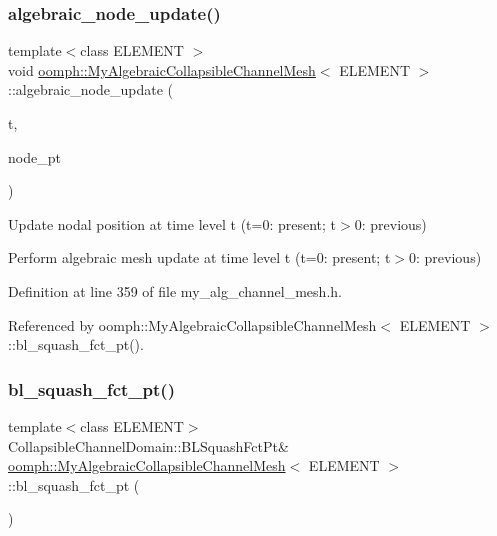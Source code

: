 \subsubsection{\texorpdfstring{algebraic\+\_\+node\+\_\+update()}{algebraic\_node\_update()}}
{\footnotesize\ttfamily template$<$class E\+L\+E\+M\+E\+NT $>$ \\
void \hyperlink{classoomph_1_1MyAlgebraicCollapsibleChannelMesh}{oomph\+::\+My\+Algebraic\+Collapsible\+Channel\+Mesh}$<$ E\+L\+E\+M\+E\+NT $>$\+::algebraic\+\_\+node\+\_\+update (\begin{DoxyParamCaption}\item[{const unsigned \&}]{t,  }\item[{Algebraic\+Node $\ast$\&}]{node\+\_\+pt }\end{DoxyParamCaption})}



Update nodal position at time level t (t=0\+: present; t$>$0\+: previous) 

Perform algebraic mesh update at time level t (t=0\+: present; t$>$0\+: previous) 

Definition at line 359 of file my\+\_\+alg\+\_\+channel\+\_\+mesh.\+h.



Referenced by oomph\+::\+My\+Algebraic\+Collapsible\+Channel\+Mesh$<$ E\+L\+E\+M\+E\+N\+T $>$\+::bl\+\_\+squash\+\_\+fct\+\_\+pt().

\mbox{\label{classoomph_1_1MyAlgebraicCollapsibleChannelMesh_ad488fafa275b664c739828d3e2a281bf}} 
\subsubsection{\texorpdfstring{bl\+\_\+squash\+\_\+fct\+\_\+pt()}{bl\_squash\_fct\_pt()}}
{\footnotesize\ttfamily template$<$class E\+L\+E\+M\+E\+NT$>$ \\
Collapsible\+Channel\+Domain\+::\+B\+L\+Squash\+Fct\+Pt\& \hyperlink{classoomph_1_1MyAlgebraicCollapsibleChannelMesh}{oomph\+::\+My\+Algebraic\+Collapsible\+Channel\+Mesh}$<$ E\+L\+E\+M\+E\+NT $>$\+::bl\+\_\+squash\+\_\+fct\+\_\+pt (\begin{DoxyParamCaption}{ }\end{DoxyParamCaption})\hspace{0.3cm}{\ttfamily [inline]}}



